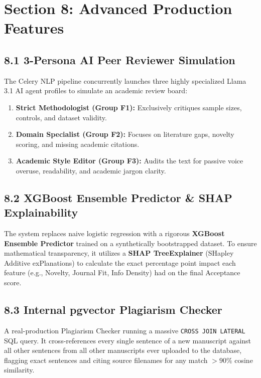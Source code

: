 \documentclass[11pt,a4paper]{article}
\begin{document}
\bigskip

\section{Section 8: Advanced Production Features}

\subsection*{8.1 3-Persona AI Peer Reviewer Simulation}
The Celery NLP pipeline concurrently launches three highly specialized Llama 3.1 AI agent profiles to simulate an academic review board:
\begin{enumerate}
    \item \textbf{Strict Methodologist (Group F1):} Exclusively critiques sample sizes, controls, and dataset validity.
    \item \textbf{Domain Specialist (Group F2):} Focuses on literature gaps, novelty scoring, and missing academic citations.
    \item \textbf{Academic Style Editor (Group F3):} Audits the text for passive voice overuse, readability, and academic jargon clarity.
\end{enumerate}

\subsection*{8.2 XGBoost Ensemble Predictor \& SHAP Explainability}
The system replaces naive logistic regression with a rigorous \textbf{XGBoost Ensemble Predictor} trained on a synthetically bootstrapped dataset. To ensure mathematical transparency, it utilizes a \textbf{SHAP TreeExplainer} (SHapley Additive exPlanations) to calculate the exact percentage point impact each feature (e.g., Novelty, Journal Fit, Info Density) had on the final Acceptance score.

\subsection*{8.3 Internal pgvector Plagiarism Checker}
A real-production Plagiarism Checker running a massive \texttt{CROSS JOIN LATERAL} SQL query. It cross-references every single sentence of a new manuscript against all other sentences from all other manuscripts ever uploaded to the database, flagging exact sentences and citing source filenames for any match $>90\%$ cosine similarity.
\end{document}
